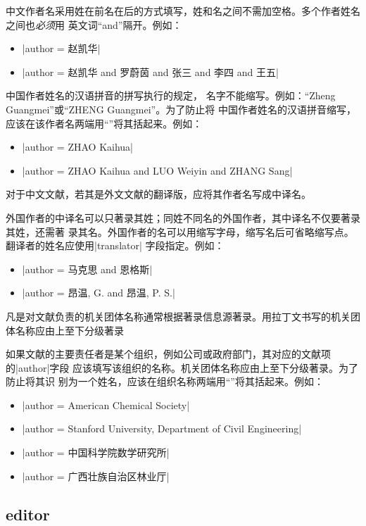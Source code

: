 中文作者名采用姓在前名在后的方式填写，姓和名之间不需加空格。多个作者姓名之间也\emph{必须}用
英文词``and''隔开。例如：
\begin{itemize}
\item |author = {赵凯华}|
\item |author = {赵凯华 and 罗蔚茵 and 张三 and 李四 and 王五}|
\end{itemize}

中国作者姓名的汉语拼音的拼写执行的规定\cite{gbt16159-2012}，
名字不能缩写。例如：``Zheng Guangmei''或``ZHENG Guangmei''。为了防止{\BibTeX}将
中国作者姓名的汉语拼音缩写，应该在该作者名两端用``{}''将其括起来。例如：
\begin{itemize}
\item |author = {{ZHAO Kaihua}}|
\item |author = {{ZHAO Kaihua} and {LUO Weiyin} and {ZHANG Sang}}|
\end{itemize}

对于中文文献，若其是外文文献的翻译版，应将其作者名写成中译名。

外国作者的中译名可以只著录其姓；同姓不同名的外国作者，其中译名不仅要著录其姓，还需著
录其名。外国作者的名可以用缩写字母，缩写名后可省略缩写点。翻译者的姓名应使用|translator|
字段指定。例如：
\begin{itemize}
\item |author = {马克思 and 恩格斯}|
\item |author = {昂温, G. and 昂温, P. S.}|
\end{itemize}

凡是对文献负责的机关团体名称通常根据著录信息源著录。用拉丁文书写的机关团体名称应由上至下分级著录 

如果文献的主要责任者是某个组织，例如公司或政府部门，其对应的文献项的|author|字段
应该填写该组织的名称。机关团体名称应由上至下分级著录。为了防止{\BibTeX}将其识
别为一个姓名，应该在组织名称两端用``{}''将其括起来。例如：
\begin{itemize}
\item |author = {{American Chemical Society}}|
\item |author = {{Stanford University, Department of Civil Engineering}}|
\item |author = {{中国科学院数学研究所}}|
\item |author = {{广西壮族自治区林业厅}}|
\end{itemize}


\subsection{editor}\label{subsec:bibfield-editor}


